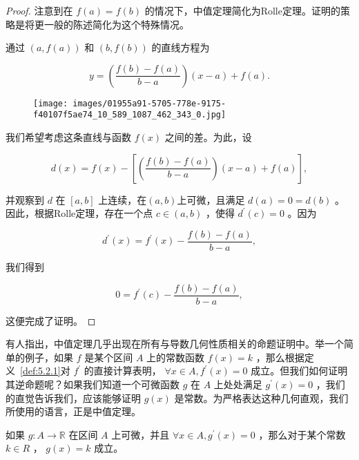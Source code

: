 \begin{proof}
注意到在 \(f\left( a\right)  = f\left( b\right)\) 的情况下，中值定理简化为Rolle定理。证明的策略是将更一般的陈述简化为这个特殊情况。

通过 \(\left( {a,f\left( a\right) }\right)\) 和 \(\left( {b,f\left( b\right) }\right)\) 的直线方程为

\[
y = \left( \frac{f\left( b\right)  - f\left( a\right) }{b - a}\right) \left( {x - a}\right)  + f\left( a\right) .
\]

\begin{figure}[h]
  \centering
  \texttt{[image: images/01955a91-5705-778e-9175-f40107f5ae74\_10\_589\_1087\_462\_343\_0.jpg]}
\end{figure}

我们希望考虑这条直线与函数 \(f\left( x\right)\) 之间的差。为此，设

\[
d\left( x\right)  = f\left( x\right)  - \left\lbrack  {\left( \frac{f\left( b\right)  - f\left( a\right) }{b - a}\right) \left( {x - a}\right)  + f\left( a\right) }\right\rbrack  ,
\]

并观察到 \(d\) 在 \(\left\lbrack  {a,b}\right\rbrack\) 上连续，在$(a, b)$上可微，且满足 \(d\left( a\right)  = 0 = d\left( b\right)\) 。因此，根据Rolle定理，存在一个点 \(c \in  \left( {a,b}\right)\) ，使得 \({d}^{\prime }\left( c\right)  = 0\) 。因为

\[
{d}^{\prime }\left( x\right)  = {f}^{\prime }\left( x\right)  - \frac{f\left( b\right)  - f\left( a\right) }{b - a},
\]

我们得到

\[
0 = {f}^{\prime }\left( c\right)  - \frac{f\left( b\right)  - f\left( a\right) }{b - a},
\]

这便完成了证明。
\end{proof}

有人指出，中值定理几乎出现在所有与导数几何性质相关的命题证明中。举一个简单的例子，如果 \(f\) 是某个区间 \(A\) 上的常数函数 \(f\left( x\right)  = k\) ，那么根据定义~\ref{def:5.2.1}对 \({f}^{\prime }\) 的直接计算表明， \(\forall x \in  A, {f}^{\prime }\left( x\right)  = 0\) 成立。但我们如何证明其逆命题呢？如果我们知道一个可微函数 \(g\) 在 \(A\) 上处处满足 \({g}^{\prime }\left( x\right)  = 0\) ，我们的直觉告诉我们，应该能够证明 \(g\left( x\right)\) 是常数。为严格表达这种几何直观，我们所使用的语言，正是中值定理。

\begin{Cor}
  \label{cor:5.3.3}
  如果 \(g : A \rightarrow  \mathbb{R}\) 在区间 \(A\) 上可微，并且 \(\forall x \in  A, {g}^{\prime }\left( x\right)  = 0\) ，那么对于某个常数 \(k \in  R\) ， \(g\left( x\right)  = k\) 成立。
\end{Cor}

